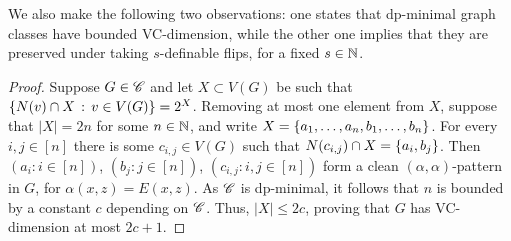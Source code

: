 We also make the following two observations:
one states that dp-minimal graph classes have bounded VC-dimension,
while the other one implies that they are preserved under taking $s$-definable flips, for a fixed $s\in\mathbb N$.

\obsdpvc*
\begin{proof}
    Suppose $G\in\mathscr C$ and let $X\subset V(G)$ be such that $\{N(v)\cap X \,:\, v\in V(G) \}=2^X$.
    Removing at most one element from $X$, suppose that $|X|=2n$ for some $n\in\mathbb N$, and write $X=\{a_1,\ldots,a_n,b_1,\ldots,b_n\}$.
    For every $i,j\in[n]$ there is some $c_{i,j}\in V(G)$ such that ${N(c_{i,j})\cap X=\{a_i,b_j\}}$.
    Then $(a_i:i\in[n])$, $(b_j:j\in[n])$, $(c_{i,j}:i,j\in[n])$ form a clean
    $(\alpha,\alpha)$-pattern in $G$, for $\alpha(x,z)=E(x,z)$. As $\mathscr C$ is dp-minimal, it follows that $n$ is bounded by a constant $c$ depending on $\mathscr C$. Thus, $|X|\le 2c$, proving that $G$ has VC-dimension at most $2c+1$.
\end{proof}

